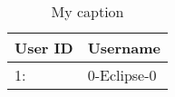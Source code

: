 \begin{table}[]
\centering
\caption{My caption}
\label{my-label}
\begin{tabular}{|l|l|}
\hline
User ID & Username    \\ \hline
1:      & 0-Eclipse-0 \\ \hline
\end{tabular}
\end{table}
